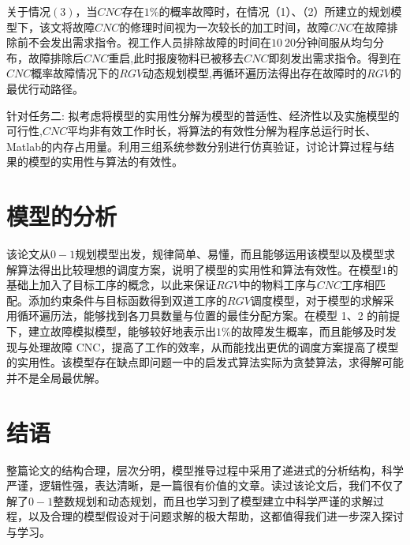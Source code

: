 \documentclass{whutmod}
\begin{document}
	
	关于情况$(3)$，当$CNC$存在$1\%$的概率故障时，在情况（1）、（2）所建立的规划模型下，该文将故障$CNC$的修理时间视为一次较长的加工时间，故障$CNC$在故障排除前不会发出需求指令。视工作人员排除故障的时间在$10 ~20$分钟间服从均匀分布，故障排除后$CNC$重启,此时报废物料已被移去$CNC$即刻发出需求指令。得到在$CNC$概率故障情况下的$RGV$动态规划模型,再循环遍历法得出存在故障时的$RGV$的最优行动路径。
	
	针对任务二:
	拟考虑将模型的实用性分解为模型的普适性、经济性以及实施模型的可行性,$CNC$平均非有效工作时长，将算法的有效性分解为程序总运行时长、Matlab的内存占用量。利用三组系统参数分别进行仿真验证，讨论计算过程与结果的模型的实用性与算法的有效性。
	
	\section{模型的分析}
	该论文从$0-1$规划模型出发，规律简单、易懂，而且能够运用该模型以及模型求解算法得出比较理想的调度方案，说明了模型的实用性和算法有效性。在模型$1$的基础上加入了目标工序的概念，以此来保证$RGV$中的物料工序与$CNC$工序相匹配。添加约束条件与目标函数得到双道工序的$RGV$调度模型，对于模型的求解采用循环遍历法，能够找到各刀具数量与位置的最佳分配方案。在模型 1、2 的前提下，建立故障模拟模型，能够较好地表示出$1\%$的故障发生概率，而且能够及时发现与处理故障 CNC，提高了工作的效率，从而能找出更优的调度方案提高了模型的实用性。该模型存在缺点即问题一中的启发式算法实际为贪婪算法，求得解可能并不是全局最优解。
	
	
	\section{结语}
	整篇论文的结构合理，层次分明，模型推导过程中采用了递进式的分析结构，科学严谨，逻辑性强，表达清晰，是一篇很有价值的文章。读过该论文后，我们不仅了解了$0-1$整数规划和动态规划，而且也学习到了模型建立中科学严谨的求解过程，以及合理的模型假设对于问题求解的极大帮助，这都值得我们进一步深入探讨与学习。
\end{document}
